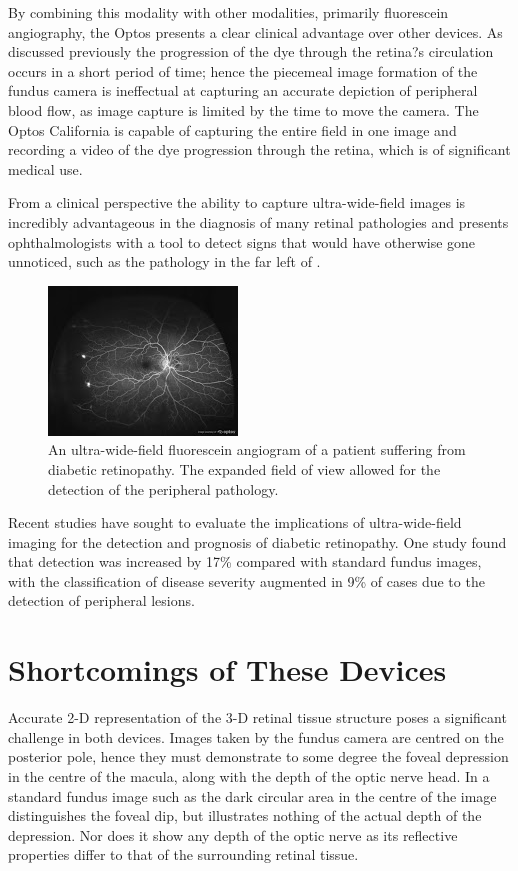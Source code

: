 By combining this modality with other modalities, primarily fluorescein
angiography, the Optos presents a clear clinical advantage over other
devices. As discussed previously the progression of the dye through the
retina?s circulation occurs in a short period of time; hence the piecemeal
image formation of the fundus camera is ineffectual at capturing an accurate
depiction of peripheral blood flow, as image capture is limited by the time
to move the camera. The Optos California is capable of capturing the entire
field in one image and recording a video of the dye progression through the
retina, which is of significant medical use.

From a clinical perspective the ability to capture ultra-wide-field images
is incredibly advantageous in the diagnosis of many retinal pathologies
\cite{6_witmer_kozbial_daniel_kiss_2012} and presents ophthalmologists
with a tool to detect signs that would have otherwise gone unnoticed, such
as the pathology in the far left of .

\begin{figure}[H]
\centering
\includegraphics{figures/uwfdr}
\caption{An ultra-wide-field fluorescein angiogram of a patient suffering from diabetic retinopathy. The expanded field of view allowed for the detection of the peripheral pathology.}
\label{fig:uwfdr}
   \end{figure}

Recent studies have sought to evaluate the implications of ultra-wide-field
imaging for the detection and prognosis of diabetic retinopathy. One study
found that detection was increased by 17\% compared with standard fundus images,
with the classification of disease severity augmented in 9\% of cases due to the
detection of peripheral lesions. \cite{silva2014potential}


\section{Shortcomings of These Devices}


Accurate 2-D representation of the 3-D retinal tissue structure
poses a significant challenge in both devices. Images taken by the
fundus camera are centred on the posterior pole, hence they must
demonstrate to some degree the foveal depression in the centre of
the macula, along with the depth of the optic nerve head. In a standard
fundus image such as  the dark circular area in the
centre of the image distinguishes the foveal dip, but illustrates
nothing of the actual depth of the depression. Nor does it show any
depth of the optic nerve as its reflective properties differ to that
of the surrounding retinal tissue.

